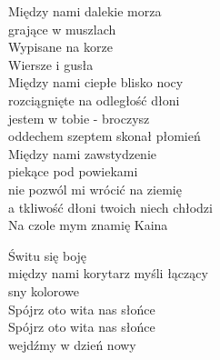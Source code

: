 \begin{text}
    Między nami dalekie morza\\
    grające w muszlach\\
    Wypisane na korze\\
    Wiersze i gusła\\
    Między nami ciepłe blisko nocy\\
    rozciągnięte na odległość dłoni\\
    jestem w tobie - broczysz\\
    oddechem szeptem skonał płomień\\
    Między nami zawstydzenie\\
    piekące pod powiekami\\
    nie pozwól mi wrócić na ziemię\\
    a tkliwość dłoni twoich niech chłodzi\\
    Na czole mym znamię Kaina

    Świtu się boję\\
    między nami korytarz myśli łączący\\
    sny kolorowe\\
    Spójrz oto wita nas słońce\\
    Spójrz oto wita nas słońce\\
    wejdźmy w dzień nowy
\end{text}
\begin{chord}

\end{chord}